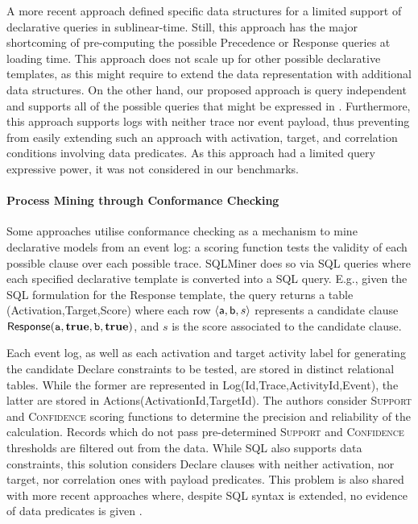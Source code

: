A more recent approach \cite{abs-2112-04623} defined specific data structures for a limited support of declarative queries in sublinear-time. Still, this approach has the major shortcoming of pre-computing the possible \textsf{Precedence} or \textsf{Response} queries at loading time. This approach does not scale up for other possible declarative templates, as this might require to extend the data representation  with additional data structures. On the other hand, our proposed approach is query independent and supports all of the possible queries that might be expressed in \xLTLf. Furthermore, this approach supports logs with neither trace nor event payload, thus preventing from easily extending such an approach with activation, target, and correlation conditions involving data predicates. As this approach had a limited query expressive power, it was not considered in our benchmarks.

\paragraph*{Process Mining through Conformance Checking}
Some approaches utilise conformance checking as a mechanism to mine declarative {models}  from an event log: a scoring function tests %
the validity of each possible clause over each possible trace. %
SQLMiner \cite{SchonigRCJM16} {does so via} SQL queries \cite{Schonig15} {where e}ach specified declarative {template} %
{is} converted into a SQL query. E.g., given the SQL formulation for the \textsf{Response} template, the query returns a table \textsf{(Activation,Target,Score)} where each row $\braket{\textsf{a},\textsf{b},s}$ represents a candidate clause $\textsf{Response}(\texttt{a},\textbf{true},\texttt{b},\textbf{true})$, and $s$ is the  score associated to the candidate clause.

Each event log, as well as each activation and target activity label for generating the candidate Declare constraints to be tested, are stored in distinct relational tables. While the former are represented in  \textsf{Log(Id,Trace,ActivityId,Event)}, the latter are stored in \textsf{Actions(ActivationId,TargetId)}. The authors consider 
\textsc{Support} and \textsc{Confidence} scoring functions to determine the precision and reliability of the calculation. Records which do not pass pre-determined \textsc{Support} and \textsc{Confidence} thresholds are filtered out from the data. While SQL also supports data constraints, this solution considers Declare clauses with neither activation, nor target, %
nor correlation ones with payload predicates. This problem is also shared with  more recent approaches where, despite SQL syntax is extended, no evidence of data predicates is given \cite{Polyvyanyy2022}. 

